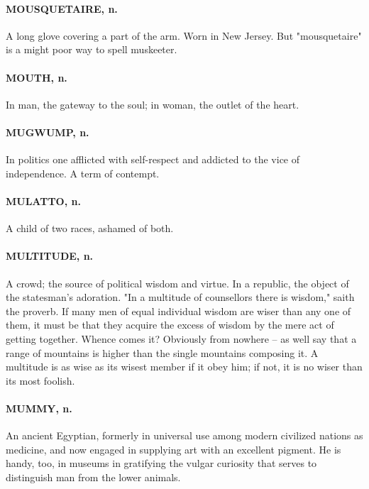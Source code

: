 \documentclass[11pt]{article}
\begin{document}
\paragraph{MOUSQUETAIRE, n.}  A long glove covering a part of the arm.  Worn in
New Jersey.  But "mousquetaire" is a might poor way to spell
muskeeter.

\paragraph{MOUTH, n.}  In man, the gateway to the soul; in woman, the outlet of
the heart.

\paragraph{MUGWUMP, n.}  In politics one afflicted with self-respect and addicted
to the vice of independence.  A term of contempt.

\paragraph{MULATTO, n.}  A child of two races, ashamed of both.

\paragraph{MULTITUDE, n.}  A crowd; the source of political wisdom and virtue.  In
a republic, the object of the statesman's adoration.  "In a multitude
of counsellors there is wisdom," saith the proverb.  If many men of
equal individual wisdom are wiser than any one of them, it must be
that they acquire the excess of wisdom by the mere act of getting
together.  Whence comes it?  Obviously from nowhere -- as well say
that a range of mountains is higher than the single mountains
composing it.  A multitude is as wise as its wisest member if it obey
him; if not, it is no wiser than its most foolish.

\paragraph{MUMMY, n.}  An ancient Egyptian, formerly in universal use among modern
civilized nations as medicine, and now engaged in supplying art with
an excellent pigment.  He is handy, too, in museums in gratifying the
vulgar curiosity that serves to distinguish man from the lower
animals.
\end{document}
